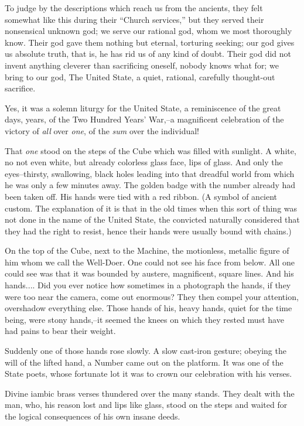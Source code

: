 \documentclass[11pt,openany]{book}
\begin{document}
To judge by the descriptions which reach us from the ancients, they felt somewhat like this during their ``Church services,'' but they served their nonsensical unknown god; we serve our rational god, whom we most thoroughly know. Their god gave them nothing but eternal, torturing seeking; our god gives us absolute truth, that is, he has rid us of any kind of doubt. Their god did not invent anything cleverer than sacrificing oneself, nobody knows what for; we bring to our god, The United State, a quiet, rational, carefully thought-out sacrifice.

Yes, it was a solemn liturgy for the United State, a reminiscence of the great days, years, of the Two Hundred Years' War,--a magnificent celebration of the victory of \emph{all} over \emph{one}, of the \emph{sum} over the individual!

That \emph{one} stood on the steps of the Cube which was filled with sunlight. A white, no not even white, but already colorless glass face, lips of glass. And only the eyes--thirsty, swallowing, black holes leading into that dreadful world from which he was only a few minutes away. The golden badge with the number already had been taken off. His hands were tied with a red ribbon. (A symbol of ancient custom. The explanation of it is that in the old times when this sort of thing was not done in the name of the United State, the convicted naturally considered that they had the right to resist, hence their hands were usually bound with chains.)

On the top of the Cube, next to the Machine, the motionless, metallic figure of him whom we call the Well-Doer. One could not see his face from below. All one could see was that it was bounded by austere, magnificent, square lines. And his hands.... Did you ever notice how sometimes in a photograph the hands, if they were too near the camera, come out enormous? They then compel your attention, overshadow everything else. Those hands of his, heavy hands, quiet for the time being, were stony hands,--it seemed the knees on which they rested must have had pains to bear their weight.

Suddenly one of those hands rose slowly. A slow cast-iron gesture; obeying the will of the lifted hand, a Number came out on the platform. It was one of the State poets, whose fortunate lot it was to crown our celebration with his verses.

Divine iambic brass verses thundered over the many stands. They dealt with the man, who, his reason lost and lips like glass, stood on the steps and waited for the logical consequences of his own insane deeds.
\end{document}
